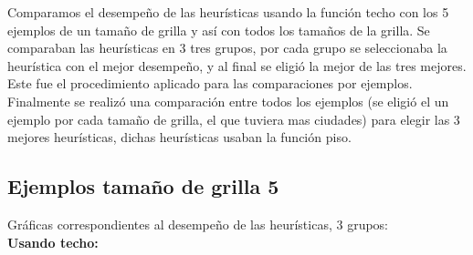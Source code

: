 \documentclass[10pt]{article}
\begin{document}
Comparamos el desempeño de las heurísticas usando la función techo con los 5 ejemplos de un tamaño de grilla y así con todos los tamaños de la grilla. Se comparaban las heurísticas en 3 tres grupos,
por cada grupo se seleccionaba la heurística con el mejor desempeño, y al final se eligió la mejor de las tres mejores. Este fue el procedimiento aplicado para las comparaciones por ejemplos. Finalmente
se realizó una comparación entre todos los ejemplos (se eligió el un ejemplo por cada tamaño de grilla, el que tuviera mas ciudades) para elegir las 3 mejores heurísticas, dichas heurísticas
usaban la función piso. \\



\newpage
\subsection{Ejemplos tamaño de grilla 5}

Gráficas correspondientes al desempeño de las heurísticas, 3 grupos:\\
\textbf{Usando techo:}
\end{document}
